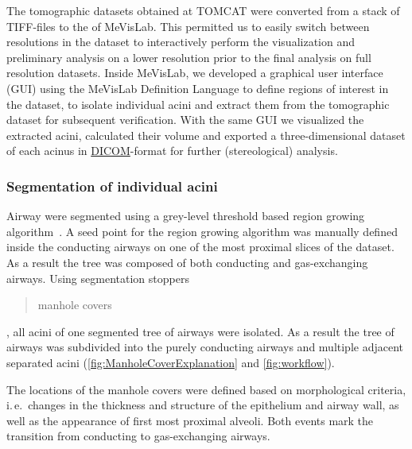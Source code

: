 \documentclass[final,paper=a4,DIV=calc,abstract,english]{scrartcl}
\newcommand{\ie}{i.\,e.\ }
\begin{document}
The tomographic datasets obtained at TOMCAT were converted from a stack of TIFF-files to the  of MeVisLab.
This permitted us to easily switch between resolutions in the dataset to interactively perform the visualization and preliminary analysis on a lower resolution prior to the final analysis on full resolution datasets.
Inside MeVisLab, we developed a graphical user interface (GUI) using the MeVisLab Definition Language to define regions of interest in the dataset, to isolate individual acini and  extract them from the tomographic dataset for subsequent verification.
With the same GUI we visualized the extracted acini, calculated their volume and exported a three-dimensional dataset of each acinus in \href{http://en.wikipedia.org/w/index.php?title=DICOM&oldid=511155074}{DICOM}-format for further (stereological) analysis.

\subsubsection{Segmentation of individual acini}
\label{sec:manhole covers}
Airway  were segmented using a grey-level threshold based region growing algorithm~\citep{Zucker1976}.
A seed point for the region growing algorithm was manually defined inside the conducting airways on one of the most proximal slices of the dataset.
As a result the tree was composed of both conducting and gas-exchanging airways.
Using segmentation stoppers \blockquote{manhole covers}, all acini of one segmented tree of airways were isolated.
As a result the tree of airways was subdivided into the purely conducting airways and multiple adjacent separated acini (\autoref{fig:ManholeCoverExplanation} and \ref{fig:workflow}).

The locations of the manhole covers were defined based on morphological criteria, \ie changes in the thickness and structure of the epithelium and airway wall, as well as the appearance of first most proximal alveoli.
Both events mark the transition from conducting to gas-exchanging airways.
\end{document}
